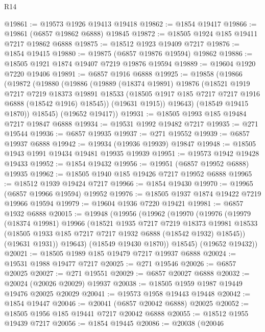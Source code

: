 \begin{lexlean}{R14}
\begin{coremodule}
@19861 := @19573 @1926 @19413 @19418
@19862 := @1854 @19417
@19866 := @19861 (@6857 @19862 @6888) @19845
@19872 := @18505 @1924 @185 @19411 @7217 @19862 @6888
@19875 := @18512 @1923 @19409 @7217
@19876 := @1854 @19415
@19880 := @19875 (@6857 @19876 @19594) @19862
@19886 := @18505 @1921 @1874 @19407 @7219 @19876 @19594
@19889 := @19604 @1920 @7220 @19406
@19891 := @6857 @1916 @6888
@19925 := @19858
    (@19866
      (@19872
        (@19880
          (@19886
            (@19889
              (@18374 @19891)
              @19876
              (@18521
                @1919
                @7217
                @7219
                @18373
                @19891
                @18533
                (@18505 @1917 @185 @7217 @7217 @1916 @6888 (@18542 @1916) @18545))
              (@19631 @1915))
            @19643)
          (@18549 @19415 @1870))
        @18545)
      (@19652 @19417))
@19931 := @18505 @1993 @185 @19484 @7217 @19847 @6888
@19934 := @19531 @1992 @19482 @7217
@19935 := @271 @19544
@19936 := @6857 @19935
@19937 := @271 @19552
@19939 := @6857 @19937 @6888
@19942 := @19934 (@19936 @19939) @19847
@19948 := @18505 @1943 @1991 @19434 @19481 @19935 @19939
@19951 := @19573 @1942 @19428 @19433
@19952 := @1854 @19432
@19956 := @19951 (@6857 @19952 @6888) @19935
@19962 := @18505 @1940 @185 @19426 @7217 @19952 @6888
@19965 := @18512 @1939 @19424 @7217
@19966 := @1854 @19430
@19970 := @19965 (@6857 @19966 @19594) @19952
@19976 := @18505 @1937 @1874 @19422 @7219 @19966 @19594
@19979 := @19604 @1936 @7220 @19421
@19981 := @6857 @1932 @6888
@20015 := @19948
    (@19956
      (@19962
        (@19970
          (@19976
            (@19979
              (@18374 @19981)
              @19966
              (@18521
                @1935
                @7217
                @7219
                @18373
                @19981
                @18533
                (@18505 @1933 @185 @7217 @7217 @1932 @6888 (@18542 @1932) @18545))
              (@19631 @1931))
            @19643)
          (@18549 @19430 @1870))
        @18545)
      (@19652 @19432))
@20021 := @18505 @1989 @185 @19479 @7217 @19937 @6888
@20024 := @19531 @1988 @19477 @7217
@20025 := @271 @19546
@20026 := @6857 @20025
@20027 := @271 @19551
@20029 := @6857 @20027 @6888
@20032 := @20024 (@20026 @20029) @19937
@20038 := @18505 @1959 @1987 @19449 @19476 @20025 @20029
@20041 := @19573 @1958 @19443 @19448
@20042 := @1854 @19447
@20046 := @20041 (@6857 @20042 @6888) @20025
@20052 := @18505 @1956 @185 @19441 @7217 @20042 @6888
@20055 := @18512 @1955 @19439 @7217
@20056 := @1854 @19445
@20086 := @20038
    (@20046

\end{coremodule}
\end{lexlean}

